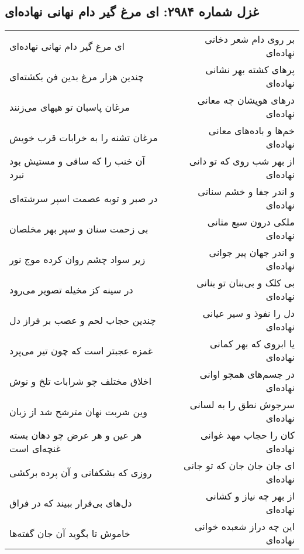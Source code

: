 \begin{center}
\section*{غزل شماره ۲۹۸۴: ای مرغ گیر دام نهانی نهاده‌ای}
\label{sec:2984}
\begin{longtable}{l p{0.5cm} r}
ای مرغ گیر دام نهانی نهاده‌ای
&&
بر روی دام شعر دخانی نهاده‌ای
\\
چندین هزار مرغ بدین فن بکشته‌ای
&&
پرهای کشته بهر نشانی نهاده‌ای
\\
مرغان پاسبان تو هیهای می‌زنند
&&
درهای هویشان چه معانی نهاده‌ای
\\
مرغان تشنه را به خرابات قرب خویش
&&
خم‌ها و باده‌های معانی نهاده‌ای
\\
آن خنب را که ساقی و مستیش بود نبرد
&&
از بهر شب روی که تو دانی نهاده‌ای
\\
در صبر و توبه عصمت اسپر سرشته‌ای
&&
و اندر جفا و خشم سنانی نهاده‌ای
\\
بی زحمت سنان و سپر بهر مخلصان
&&
ملکی درون سبع مثانی نهاده‌ای
\\
زیر سواد چشم روان کرده موج نور
&&
و اندر جهان پیر جوانی نهاده‌ای
\\
در سینه کز مخیله تصویر می‌رود
&&
بی کلک و بی‌بنان تو بنانی نهاده‌ای
\\
چندین حجاب لحم و عصب بر فراز دل
&&
دل را نفوذ و سیر عیانی نهاده‌ای
\\
غمزه عجبتر است که چون تیر می‌پرد
&&
یا ابروی که بهر کمانی نهاده‌ای
\\
اخلاق مختلف چو شرابات تلخ و نوش
&&
در جسم‌های همچو اوانی نهاده‌ای
\\
وین شربت نهان مترشح شد از زبان
&&
سرجوش نطق را به لسانی نهاده‌ای
\\
هر عین و هر عرض چو دهان بسته غنچه‌ای است
&&
کان را حجاب مهد غوانی نهاده‌ای
\\
روزی که بشکفانی و آن پرده برکشی
&&
ای جان جان جان که تو جانی نهاده‌ای
\\
دل‌های بی‌قرار ببیند که در فراق
&&
از بهر چه نیاز و کشانی نهاده‌ای
\\
خاموش تا بگوید آن جان گفته‌ها
&&
این چه دراز شعبده خوانی نهاده‌ای
\\
\end{longtable}
\end{center}
